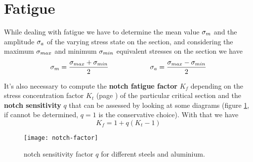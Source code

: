 \section{Fatigue}
	While dealing with fatigue we have to determine the mean value $\sigma_{m}$ and the amplitude $\sigma_{a}$ of the varying stress state on the section, and considering the maximum $\sigma_{max}$ and minimum $\sigma_{min}$ equivalent stresses on the section we have
	\begin{equation}
		\sigma_{m} = \frac{\sigma_{max} +\sigma_{min}}{2} \qquad \qquad \qquad \sigma_{a} = \frac{\sigma_{max}-\sigma_{min}}{2}
	\end{equation} 
	
	It's also necessary to compute the \textbf{notch fatigue factor} $K_f$ depending on the stress concentration factor $K_t$ (page \pageref{fig:stressconcentrationfactors}) of the particular critical section and the \textbf{notch sensitivity} $q$ that can be assessed by looking at some diagrams (figure \ref{fig:notchsens}, if cannot be determined, $q=1$ is the conservative choice). With that we have
	\begin{equation} \label{eq:notchfactor}
		K_f = 1 + q(K_t-1)
	\end{equation}
	
	\begin{figure}[bht]
		\centering \texttt{[image: notch-factor]}
		\caption{notch sensitivity factor $q$ for different steels and aluminium.} \label{fig:notchsens}
	\end{figure}
	
